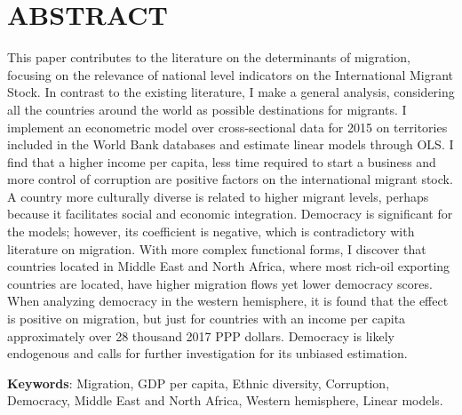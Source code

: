 \documentclass[../main.tex]{subfiles}
\begin{document}
\section*{ABSTRACT}
\noindent
This paper contributes to the literature on the determinants of migration, focusing on the relevance of national level indicators on the International Migrant Stock. In contrast to the existing literature, I make a general analysis, considering all the countries around the world as possible destinations for migrants. I implement an econometric model over cross-sectional data for 2015 on territories included in the World Bank databases and estimate linear models through OLS. I find that a higher income per capita, less time required to start a business and more control of corruption are positive factors on the international migrant stock. A country more culturally diverse is related to higher migrant levels, perhaps because it facilitates social and economic integration. Democracy is significant for the models; however, its coefficient is negative, which is contradictory with literature on migration. With more complex functional forms, I discover that countries located in Middle East and North Africa, where most rich-oil exporting countries are located, have higher migration flows yet lower democracy scores. When analyzing democracy in the western hemisphere, it is found that the effect is positive on migration, but just for countries with an income per capita approximately over 28 thousand 2017 PPP dollars. Democracy is likely endogenous and calls for further investigation for its unbiased estimation.
     
\noindent \textbf{Keywords}: Migration, GDP per capita, Ethnic diversity, Corruption, Democracy, Middle East and North Africa, Western hemisphere, Linear models.
\end{document}
